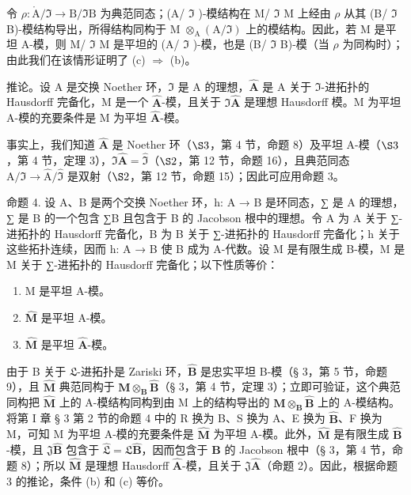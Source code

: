 令 \(\rho: \mathring{\mathrm{A}}/\mathfrak{I} \to \mathrm{B}/\mathfrak{I}\mathrm{B}\) 为典范同态；(A/ \(\mathfrak{I}\) )-模结构在 M/ \(\mathfrak{I}\) M 上经由 \(\rho\) 从其 (B/ \(\mathfrak{I}\) B)-模结构导出，所得结构同构于 M \(\otimes_{\mathrm{A}} (\mathrm{A}/\mathfrak{I})\) 上的模结构。因此，若 M 是平坦 A-模，则 M/ \(\mathfrak{I}\) M 是平坦的 (A/ \(\mathfrak{I}\) )-模，也是 (B/ \(\mathfrak{I}\) B)-模（当 \(\rho\) 为同构时）；由此我们在该情形证明了 (c) \(\Rightarrow\) (b)。

推论。设 A 是交换 Noether 环，\(\Im\) 是 A 的理想，\(\hat{\mathbf{A}}\) 是 A 关于 \(\Im\)-进拓扑的 Hausdorff 完备化，M 是一个 \(\hat{\mathbf{A}}\)-模，且关于 \(\Im\hat{\mathbf{A}}\) 是理想 Hausdorff 模。M 为平坦 A-模的充要条件是 M 为平坦 \(\hat{\mathbf{A}}\)-模。

事实上，我们知道 \(\hat{\mathbf{A}}\) 是 Noether 环（\(\S 3\)，第 4 节，命题 8）及平坦 A-模（\(\S 3\)，第 4 节，定理 3），\(\Im \hat{\mathbf{A}} = \hat{\mathfrak{I}}\)（\(\S 2\)，第 12 节，命题 16），且典范同态 \(\mathrm{A} / \Im \to \hat{\mathrm{A}} / \hat{\mathfrak{I}}\) 是双射（\(\S 2\)，第 12 节，命题 15）；因此可应用命题 3。

命题 4. 设 A、B 是两个交换 Noether 环，h: A → B 是环同态，∑ 是 A 的理想，∑ 是 B 的一个包含 ∑B 且包含于 B 的 Jacobson 根中的理想。令 A 为 A 关于 ∑-进拓扑的 Hausdorff 完备化，B 为 B 关于 ∑-进拓扑的 Hausdorff 完备化；h 关于这些拓扑连续，因而 h: A → B 使 B 成为 A-代数。设 M 是有限生成 B-模，M 是 M 关于 ∑-进拓扑的 Hausdorff 完备化；以下性质等价：

\begin{enumerate}
\def\labelenumi{(\alph{enumi})}
\item
  M 是平坦 A-模。
\item
  \(\hat{\mathbf{M}}\) 是平坦 A-模。
\item
  \(\hat{\mathbf{M}}\) 是平坦 \(\hat{\mathbf{A}}\)-模。
\end{enumerate}

由于 B 关于 \(\mathfrak{L}\)-进拓扑是 Zariski 环，\(\hat{\mathbf{B}}\) 是忠实平坦 B-模（§ 3，第 5 节，命题 9），且 \(\hat{\mathbf{M}}\) 典范同构于 \(\mathbf{M} \otimes_{\mathbf{B}} \hat{\mathbf{B}}\)（§ 3，第 4 节，定理 3）；立即可验证，这个典范同构把 \(\hat{\mathbf{M}}\) 上的 A-模结构同构到由 M 上的结构导出的 \(\mathbf{M} \otimes_{\mathbf{B}} \hat{\mathbf{B}}\) 上的 A-模结构。将第 I 章 § 3 第 2 节的命题 4 中的 R 换为 B、S 换为 A、E 换为 \(\hat{\mathbf{B}}\)、F 换为 M，可知 M 为平坦 A-模的充要条件是 \(\hat{\mathbf{M}}\) 为平坦 A-模。此外，\(\hat{\mathbf{M}}\) 是有限生成 \(\hat{\mathbf{B}}\)-模，且 \(\mathfrak{J}\hat{\mathbf{B}}\) 包含于 \(\hat{\mathfrak{L}} = \mathfrak{L}\hat{\mathbf{B}}\)，因而包含于 \(\hat{\mathbf{B}}\) 的 Jacobson 根中（§ 3，第 4 节，命题 8）；所以 \(\hat{\mathbf{M}}\) 是理想 Hausdorff \(\hat{\mathbf{A}}\)-模，且关于 \(\mathfrak{J}\hat{\mathbf{A}}\)（命题 2）。因此，根据命题 3 的推论，条件 (b) 和 (c) 等价。


